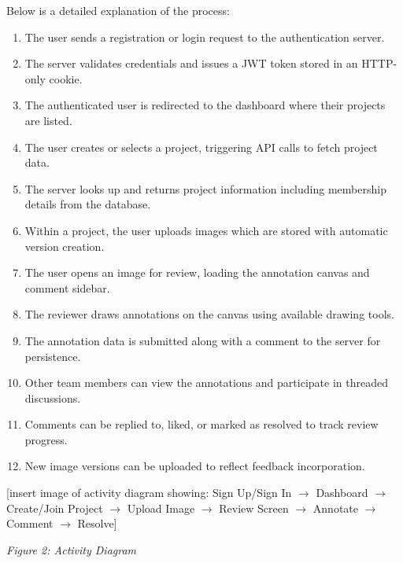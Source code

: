 \documentclass[12pt,a4paper]{article}
\begin{document}
Below is a detailed explanation of the process:
\begin{enumerate}
    \item The user sends a registration or login request to the authentication server.
    \item The server validates credentials and issues a JWT token stored in an HTTP-only cookie.
    \item The authenticated user is redirected to the dashboard where their projects are listed.
    \item The user creates or selects a project, triggering API calls to fetch project data.
    \item The server looks up and returns project information including membership details from the database.
    \item Within a project, the user uploads images which are stored with automatic version creation.
    \item The user opens an image for review, loading the annotation canvas and comment sidebar.
    \item The reviewer draws annotations on the canvas using available drawing tools.
    \item The annotation data is submitted along with a comment to the server for persistence.
    \item Other team members can view the annotations and participate in threaded discussions.
    \item Comments can be replied to, liked, or marked as resolved to track review progress.
    \item New image versions can be uploaded to reflect feedback incorporation.
\end{enumerate}

\vspace{0.5cm}

[insert image of activity diagram showing: Sign Up/Sign In $\rightarrow$ Dashboard $\rightarrow$ Create/Join Project $\rightarrow$ Upload Image $\rightarrow$ Review Screen $\rightarrow$ Annotate $\rightarrow$ Comment $\rightarrow$ Resolve]

\textit{Figure 2: Activity Diagram}
\end{document}
